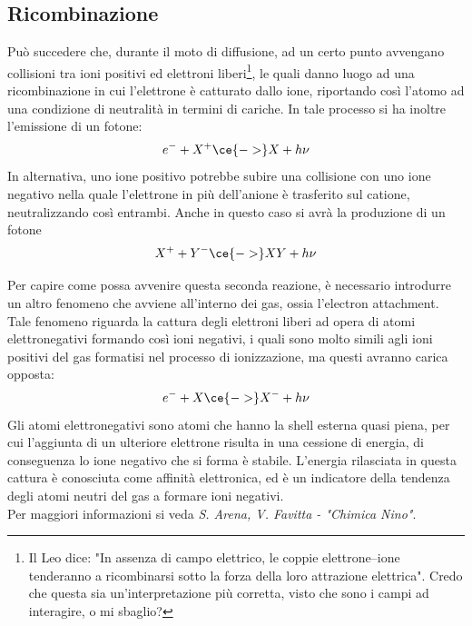 \subsection{Ricombinazione}
Può succedere che, durante il moto di diffusione, ad un certo punto avvengano collisioni tra ioni positivi ed elettroni liberi\footnote{Il Leo dice: "In assenza di campo elettrico, le coppie elettrone--ione tenderanno a ricombinarsi sotto la forza della loro attrazione elettrica". Credo che questa sia un'interpretazione più corretta, visto che sono i campi ad interagire, o mi sbaglio?}, le quali danno luogo ad una ricombinazione in cui l'elettrone è catturato dallo ione, riportando così l'atomo ad una condizione di neutralità in termini di cariche. In tale processo si ha inoltre l'emissione di un fotone:
\begin{equation*}
   e^- + X^+ \ce{->} X + h\nu
\end{equation*}
In alternativa, uno ione positivo potrebbe subire una collisione con uno ione negativo nella quale l'elettrone in più dell'anione è trasferito sul catione, neutralizzando così entrambi. Anche in questo caso si avrà la produzione di un fotone
\begin{equation*}
   X^+ + Y^- \ce{->} XY + h\nu
\end{equation*}

\begin{approfondimento}
   \footnotesize Per capire come possa avvenire questa seconda reazione, è necessario introdurre un altro fenomeno che avviene all'interno dei gas, ossia l'electron attachment.\\
   Tale fenomeno riguarda la cattura degli elettroni liberi ad opera di atomi elettronegativi formando così ioni negativi, i quali sono molto simili agli ioni positivi del gas formatisi nel processo di ionizzazione, ma questi avranno carica opposta:
   \begin{equation*}
      e^- + X \ce{->} X^- + h\nu
   \end{equation*}
   Gli atomi elettronegativi sono atomi che hanno la shell esterna quasi piena, per cui l'aggiunta di un ulteriore elettrone risulta in una cessione di energia, di conseguenza lo ione negativo che si forma è stabile. L'energia rilasciata in questa cattura è conosciuta come affinità elettronica, ed è un indicatore della tendenza degli atomi neutri del gas a formare ioni negativi.%
   \\Per maggiori informazioni si veda \textit{S. Arena, V. Favitta - "Chimica Nino"}.
\end{approfondimento}

